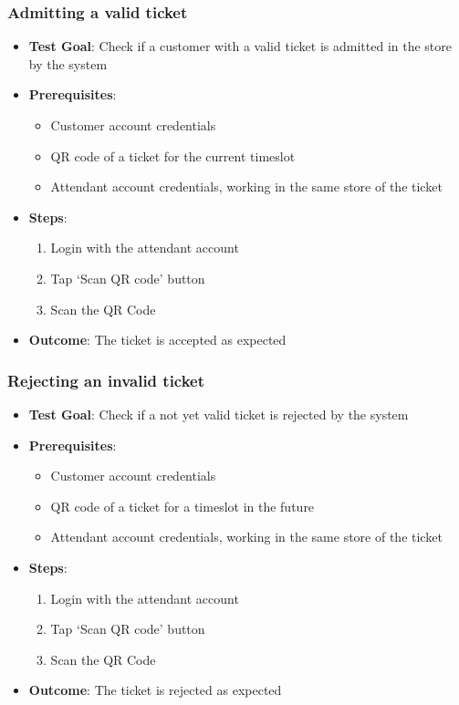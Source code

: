 \subsubsection{Admitting a valid ticket}
\begin{itemize}
    \item \textbf{Test Goal}: Check if a customer with a valid ticket is admitted in the store by the system
    \item \textbf{Prerequisites}:
          \begin{itemize}
              \item Customer account credentials
              \item QR code of a ticket for the current timeslot
              \item Attendant account credentials, working in the same store of the ticket
          \end{itemize}
    \item \textbf{Steps}:
          \begin{enumerate}
              \item Login with the attendant account
              \item Tap `Scan QR code' button
              \item Scan the QR Code
          \end{enumerate}
    \item \textbf{Outcome}: The ticket is accepted as expected
\end{itemize}
\subsubsection{Rejecting an invalid ticket}
\begin{itemize}
    \item \textbf{Test Goal}: Check if a not yet valid ticket is rejected by the system
    \item \textbf{Prerequisites}:
          \begin{itemize}
              \item Customer account credentials
              \item QR code of a ticket for a timeslot in the future
              \item Attendant account credentials, working in the same store of the ticket
          \end{itemize}
    \item \textbf{Steps}:
          \begin{enumerate}
              \item Login with the attendant account
              \item Tap `Scan QR code' button
              \item Scan the QR Code
          \end{enumerate}
    \item \textbf{Outcome}: The ticket is rejected as expected
\end{itemize}


